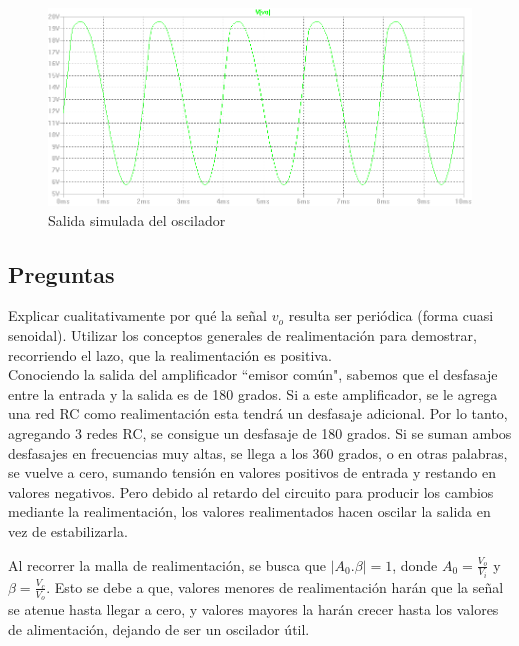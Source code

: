 \documentclass[10pt,spanish,a4paper,notitlepage]{article}
\begin{document}
\begin{figure}[H]
\centering
\includegraphics[scale=0.4]{simulaciones/5_salida.png}
\caption{Salida simulada del oscilador}
\label{fig:5_salida}
\end{figure}



\subsection{Preguntas}


{\color{OliveGreen} 
Explicar cualitativamente por qué la señal $v_o$ resulta ser
periódica (forma cuasi senoidal). Utilizar los conceptos generales de
realimentación para demostrar, recorriendo el lazo, que la realimentación es
positiva.}
\\

Conociendo la salida del amplificador ``emisor común", sabemos que el desfasaje
entre la entrada y la salida es de 180 grados.
Si a este amplificador, se le agrega una red RC como realimentación esta tendrá un
desfasaje adicional. Por lo tanto, agregando 3 redes RC, se consigue un desfasaje
de 180 grados.
Si se suman ambos desfasajes en frecuencias muy altas, se llega a los 360 grados, o en otras palabras, se
vuelve a cero, sumando tensión en valores positivos de entrada y restando en
valores negativos. Pero debido al retardo del circuito para producir los cambios
mediante la realimentación, los valores realimentados hacen oscilar la salida en
vez de estabilizarla.

Al recorrer la malla de realimentación, se busca que $|A_0.\beta|=1$, 
donde $A_0=\frac{V_o}{V_i}$ y $\beta=\frac{V_c}{V_o}$. 
Esto se debe a que, valores menores de realimentación harán 
que la señal se atenue hasta llegar a cero, y
valores mayores la harán crecer hasta los valores de alimentación, 
dejando de ser un oscilador útil.
\\
\end{document}
